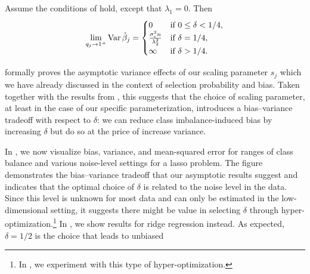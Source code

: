 \begin{corollary}
  \label{cor:ridge-variance}
  Assume the conditions of  hold, except that \(\lambda_1 = 0\). Then
  \[
    \lim_{q_j \rightarrow 1^+} \operatorname{Var} \hat{\beta}_j =
    \begin{cases}
      0                                          & \text{if } 0 \leq \delta < 1/4, \\
      \frac{\sigma_\varepsilon^2 n}{\lambda_2^2} & \text{if } \delta = 1/4,        \\
      \infty                                     & \text{if } \delta > 1/4.
    \end{cases}
  \]
\end{corollary}

 formally proves the asymptotic variance effects of our
scaling parameter \(s_j\) which we have already discussed in the context of selection
probability and bias. Taken together with the results from ,
this suggests that the choice of scaling parameter, at least in the case of our specific
parameterization, introduces a bias--variance tradeoff with respect to \(\delta\): we can
reduce class imbalance-induced bias by increasing \(\delta\) but do so at the price of
increase variance.

In , we now visualize bias, variance, and mean-squared
error for ranges of class balance and various noise-level settings for a lasso problem. The
figure demonstrates the bias--variance tradeoff that our asymptotic results suggest and
indicates that the optimal choice of \(\delta\) is related to the noise level in the data.
Since this level is unknown for most data and can only be estimated in the low-dimensional
setting, it suggests there might be value in selecting \(\delta\) through
hyper-optimization.\footnote{In , we experiment with
  this type of hyper-optimization.} In , we show results for
ridge regression instead. As expected, \(\delta = 1/2\) is the choice that leads to
unbiased

